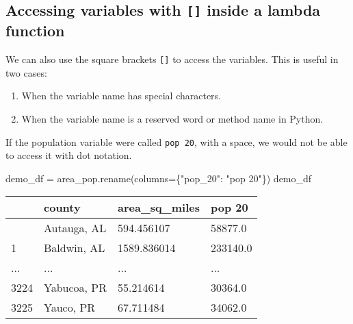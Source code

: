 \documentclass[
  letterpaper,
  DIV=11,
  numbers=noendperiod]{scrreprt}
\newenvironment{Shaded}{\begin{snugshade}}{\end{snugshade}}
\newcommand{\NormalTok}[1]{\textcolor[rgb]{0.00,0.23,0.31}{#1}}
\newcommand{\OperatorTok}[1]{\textcolor[rgb]{0.37,0.37,0.37}{#1}}
\newcommand{\StringTok}[1]{\textcolor[rgb]{0.13,0.47,0.30}{#1}}
\providecommand{\tightlist}{%
  \setlength{\itemsep}{0pt}\setlength{\parskip}{0pt}}\usepackage{longtable,booktabs,array}
\begin{document}
\begin{tcolorbox}[enhanced jigsaw, colframe=quarto-callout-tip-color-frame, opacityback=0, titlerule=0mm, bottomrule=.15mm, breakable, leftrule=.75mm, colbacktitle=quarto-callout-tip-color!10!white, title=\textcolor{quarto-callout-tip-color}{\faLightbulb}\hspace{0.5em}{Pro-tip}, rightrule=.15mm, coltitle=black, opacitybacktitle=0.6, colback=white, left=2mm, arc=.35mm, toptitle=1mm, bottomtitle=1mm, toprule=.15mm]

\subsection{\texorpdfstring{Accessing variables with \texttt{{[}{]}}
inside a lambda
function}{Accessing variables with {[}{]} inside a lambda function}}\label{accessing-variables-with-inside-a-lambda-function}

We can also use the square brackets \texttt{{[}{]}} to access the
variables. This is useful in two cases:

\begin{enumerate}
\def\labelenumi{\arabic{enumi}.}
\tightlist
\item
  When the variable name has special characters.
\item
  When the variable name is a reserved word or method name in Python.
\end{enumerate}

If the population variable were called \texttt{pop\ 20}, with a space,
we would not be able to access it with dot notation.

\begin{Shaded}
\begin{Highlighting}[]
\NormalTok{demo\_df }\OperatorTok{=}\NormalTok{ area\_pop.rename(columns}\OperatorTok{=}\NormalTok{\{}\StringTok{"pop\_20"}\NormalTok{: }\StringTok{"pop 20"}\NormalTok{\})}
\NormalTok{demo\_df}
\end{Highlighting}
\end{Shaded}

\begin{longtable}[]{@{}llll@{}}
\toprule\noalign{}
& county & area\_sq\_miles & pop 20 \\
\midrule\noalign{}
\endhead
\bottomrule\noalign{}
\endlastfoot
0 & Autauga, AL & 594.456107 & 58877.0 \\
1 & Baldwin, AL & 1589.836014 & 233140.0 \\
... & ... & ... & ... \\
3224 & Yabucoa, PR & 55.214614 & 30364.0 \\
3225 & Yauco, PR & 67.711484 & 34062.0 \\
\end{longtable}


\end{tcolorbox}
\end{document}
